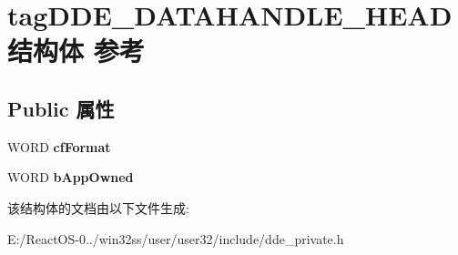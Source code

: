 \hypertarget{structtag_d_d_e___d_a_t_a_h_a_n_d_l_e___h_e_a_d}{}\section{tag\+D\+D\+E\+\_\+\+D\+A\+T\+A\+H\+A\+N\+D\+L\+E\+\_\+\+H\+E\+A\+D结构体 参考}
\label{structtag_d_d_e___d_a_t_a_h_a_n_d_l_e___h_e_a_d}
\subsection*{Public 属性}
\begin{DoxyCompactItemize}
\item 
\mbox{\label{structtag_d_d_e___d_a_t_a_h_a_n_d_l_e___h_e_a_d_a27d02c578b82de6c860b6a88e9fdbfbd}} 
W\+O\+RD {\bfseries cf\+Format}
\item 
\mbox{\label{structtag_d_d_e___d_a_t_a_h_a_n_d_l_e___h_e_a_d_a8509b0b984a67c31014e18d84782a1f2}} 
W\+O\+RD {\bfseries b\+App\+Owned}
\end{DoxyCompactItemize}


该结构体的文档由以下文件生成\+:\begin{DoxyCompactItemize}
\item 
E\+:/\+React\+O\+S-\/0../win32ss/user/user32/include/dde\+\_\+private.\+h\end{DoxyCompactItemize}
